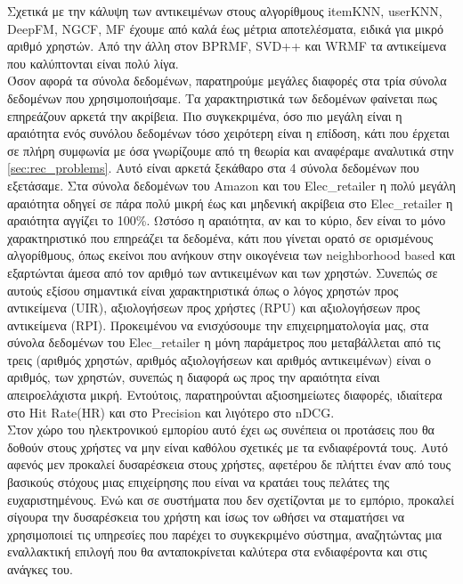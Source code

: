 Σχετικά με την κάλυψη των αντικειμένων στους αλγορίθμους itemKNN, userKNN, DeepFM, NGCF, MF έχουμε από καλά έως μέτρια αποτελέσματα, ειδικά για μικρό αριθμό χρηστών. Από την άλλη στον BPRMF, SVD++ και WRMF τα αντικείμενα που καλύπτονται είναι πολύ λίγα.\\ 
Όσον αφορά τα σύνολα δεδομένων, παρατηρούμε μεγάλες διαφορές στα τρία σύνολα δεδομένων που χρησιμοποιήσαμε. Τα χαρακτηριστικά των δεδομένων φαίνεται πως επηρεάζουν αρκετά την ακρίβεια. Πιο συγκεκριμένα, όσο πιο μεγάλη είναι η αραιότητα ενός συνόλου δεδομένων τόσο χειρότερη είναι η επίδοση, κάτι που έρχεται σε πλήρη συμφωνία με όσα γνωρίζουμε από τη θεωρία και αναφέραμε αναλυτικά στην \autoref{sec:rec_problems}. Αυτό είναι αρκετά ξεκάθαρο στα 4 σύνολα δεδομένων που εξετάσαμε. Στα σύνολα δεδομένων του Amazon και του Elec\_retailer η πολύ μεγάλη αραιότητα οδηγεί σε πάρα πολύ μικρή έως και μηδενική ακρίβεια στο Elec\_retailer η αραιότητα αγγίζει το 100\%. Ωστόσο η αραιότητα, αν και το κύριο, δεν είναι το μόνο χαρακτηριστικό που επηρεάζει τα δεδομένα, κάτι που γίνεται ορατό σε ορισμένους αλγορίθμους, όπως εκείνοι που ανήκουν στην οικογένεια των neighborhood based και εξαρτώνται άμεσα από τον αριθμό των αντικειμένων και των χρηστών.
Συνεπώς σε αυτούς εξίσου σημαντικά είναι χαρακτηριστικά όπως ο λόγος χρηστών προς αντικείμενα (UIR), αξιολογήσεων προς χρήστες (RPU) και αξιολογήσεων προς αντικείμενα (RPI). Προκειμένου να ενισχύσουμε την επιχειρηματολογία μας, στα σύνολα δεδομένων του Elec\_retailer η μόνη παράμετρος που μεταβάλλεται από τις τρεις (αριθμός χρηστών, αριθμός αξιολογήσεων και αριθμός αντικειμένων) είναι ο αριθμός, των χρηστών, συνεπώς η διαφορά ως προς την αραιότητα είναι απειροελάχιστα μικρή. Εντούτοις, παρατηρούνται αξιοσημείωτες διαφορές, ιδιαίτερα στο Hit Rate(HR) και στο Precision και λιγότερο στο nDCG. \\
 Στον χώρο του ηλεκτρονικού εμπορίου αυτό έχει ως συνέπεια οι προτάσεις που θα δοθούν στους χρήστες να μην είναι καθόλου σχετικές με τα ενδιαφέροντά τους. Αυτό αφενός μεν προκαλεί δυσαρέσκεια στους χρήστες, αφετέρου δε πλήττει έναν από τους βασικούς στόχους μιας επιχείρησης που είναι να κρατάει τους πελάτες της ευχαριστημένους. Ενώ και σε συστήματα που δεν σχετίζονται με το εμπόριο, προκαλεί σίγουρα την δυσαρέσκεια του χρήστη και ίσως τον ωθήσει να σταματήσει να χρησιμοποιεί τις υπηρεσίες που παρέχει το συγκεκριμένο σύστημα, αναζητώντας μια εναλλακτική επιλογή που θα ανταποκρίνεται καλύτερα στα ενδιαφέροντα και στις ανάγκες του.

